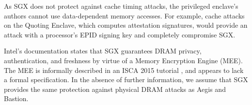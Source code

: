 As SGX does not protect against cache timing attacks, the privileged enclave's
authors cannot use data-dependent memory accesses. For example, cache attacks
on the Quoting Enclave, which computes attestation signatures, would provide
an attack with a processor's EPID signing key and completely compromise SGX.

Intel's documentation states that SGX guarantees DRAM privacy, authentication,
and freshness by virtue of a Memory Encryption Engine (MEE). The MEE is
informally described in an ISCA 2015 tutorial \cite{intel2015iscasgx}, and
appears to lack a formal specification. In the absence of further information,
we assume that SGX provides the same protection against physical DRAM attacks
as Aegis and Bastion.
